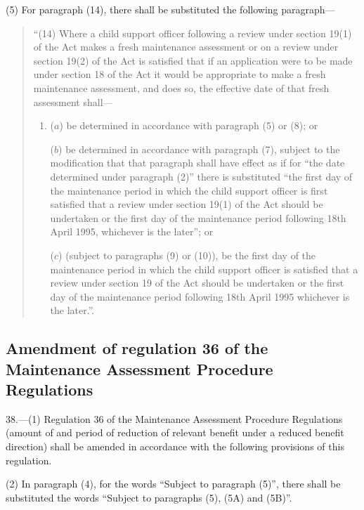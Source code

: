\documentclass[12pt,a4paper]{article}
\begin{document}
(5) For paragraph (14), there shall be substituted the following paragraph—
\begin{quotation}
“(14) Where a child support officer following a review under section 19(1) of the Act makes a fresh maintenance assessment or on a review under section 19(2) of the Act is satisfied that if an application were to be made under section 18 of the Act it would be appropriate to make a fresh maintenance assessment, and does so, the effective date of that fresh assessment shall—
\begin{enumerate}\item[]
($a$) be determined in accordance with paragraph (5) or (8); or

($b$) be determined in accordance with paragraph (7), subject to the modification that that paragraph shall have effect as if for “the date determined under paragraph (2)” there is substituted “the first day of the maintenance period in which the child support officer is first satisfied that a review under section 19(1) of the Act should be undertaken or the first day of the maintenance period following 18th April 1995, whichever is the later”; or

($c$) (subject to paragraphs (9) or (10)), be the first day of the maintenance period in which the child support officer is satisfied that a review under section 19 of the Act should be undertaken or the first day of the maintenance period following 18th April 1995 whichever is the later.”.
\end{enumerate}
\end{quotation}

\subsection[38. Amendment of regulation 36 of the Maintenance Assessment Procedure Regulations]{Amendment of regulation 36 of the Maintenance Assessment Procedure Regulations}

38.—(1) Regulation 36 of the Maintenance Assessment Procedure Regulations (amount of and period of reduction of relevant benefit under a reduced benefit direction) shall be amended in accordance with the following provisions of this regulation.

(2) In paragraph (4), for the words “Subject to paragraph (5)”, there shall be substituted the words “Subject to paragraphs (5), (5A) and (5B)”.
\end{document}
